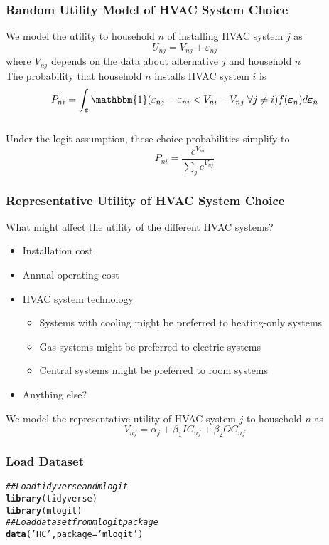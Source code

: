 \documentclass{beamer}\usepackage[]{graphicx}\usepackage[]{xcolor}
\makeatletter
\newcommand{\hlstr}[1]{\textcolor[rgb]{0.192,0.494,0.8}{#1}}%
\newcommand{\hlcom}[1]{\textcolor[rgb]{0.678,0.584,0.686}{\textit{#1}}}%
\newcommand{\hlstd}[1]{\textcolor[rgb]{0.345,0.345,0.345}{#1}}%
\newcommand{\hlkwc}[1]{\textcolor[rgb]{0.333,0.667,0.333}{#1}}%
\newcommand{\hlkwd}[1]{\textcolor[rgb]{0.737,0.353,0.396}{\textbf{#1}}}%
\newenvironment{kframe}{%
 \def\at@end@of@kframe{}%
 \ifinner\ifhmode%
  \def\at@end@of@kframe{\end{minipage}}%
  \begin{minipage}{\columnwidth}%
 \fi\fi%
 \def\FrameCommand##1{\hskip\@totalleftmargin \hskip-\fboxsep
 \colorbox{shadecolor}{##1}\hskip-\fboxsep
     \hskip-\linewidth \hskip-\@totalleftmargin \hskip\columnwidth}%
 \MakeFramed {\advance\hsize-\width
   \@totalleftmargin\z@ \linewidth\hsize
   \@setminipage}}%
 {\par\unskip\endMakeFramed%
 \at@end@of@kframe}
\newenvironment{knitrout}{}{} %
\makeatother
\begin{document}
\begin{frame}\frametitle{Random Utility Model of HVAC System Choice}
    We model the utility to household $n$ of installing HVAC system $j$ as
    $$U_{nj} = V_{nj} + \varepsilon_{nj}$$
    where $V_{nj}$ depends on the data about alternative $j$ and household $n$ \\
    \vspace{3ex}
    The probability that household $n$ installs HVAC system $i$ is
 	$$P_{ni} = \int_{\bm{\varepsilon}} \mathbbm{1}(\varepsilon_{nj} - \varepsilon_{ni} < V_{ni} - V_{nj} \; \forall j \neq i) f(\bm{\varepsilon}_n) d\bm{\varepsilon}_n$$ \\
 	\vspace{2ex}
  	Under the logit assumption, these choice probabilities simplify to
    $$P_{ni} = \frac{e^{V_{ni}}}{\sum_j e^{V_{nj}}}$$
\end{frame}

\begin{frame}\frametitle{Representative Utility of HVAC System Choice}
	What might affect the utility of the different HVAC systems?
	\begin{itemize}
		\item Installation cost
		\item Annual operating cost
		\item HVAC system technology
		\begin{itemize}
			\item Systems with cooling might be preferred to heating-only systems
			\item Gas systems might be preferred to electric systems
			\item Central systems might be preferred to room systems
		\end{itemize}
		\item Anything else?
	\end{itemize}
    \vspace{3ex}
    We model the representative utility of HVAC system $j$ to household $n$ as
    $$V_{nj} = \alpha_j + \beta_1 IC_{nj} + \beta_2 OC_{nj}$$
\end{frame}

\begin{frame}[fragile]\frametitle{Load Dataset}
\begin{knitrout}\footnotesize
{}\color{fgcolor}\begin{kframe}
\begin{alltt}
\hlcom{## Load tidyverse and mlogit}
\hlkwd{library}\hlstd{(tidyverse)}
\hlkwd{library}\hlstd{(mlogit)}
\hlcom{## Load dataset from mlogit package}
\hlkwd{data}\hlstd{(}\hlstr{'HC'}\hlstd{,} \hlkwc{package} \hlstd{=} \hlstr{'mlogit'}\hlstd{)}
\end{alltt}
\end{kframe}
\end{knitrout}
\end{frame}
\end{document}

